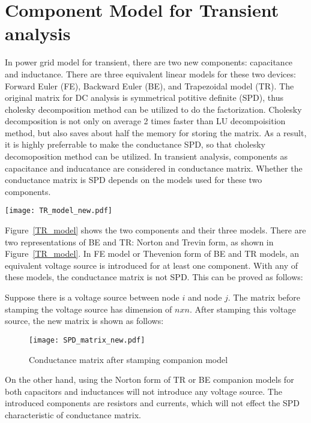 \section{Component Model for Transient analysis}
In power grid model for transient, there are two new components: capacitance and inductance. There are three equivalent linear models for
these two devices: Forward Euler (FE), Backward Euler (BE), and Trapezoidal model (TR). The original matrix for DC analysis is symmetrical potitive definite (SPD), thus cholesky decomposition method can be utilized to do the factorization. Cholesky decomposition is not only
on average 2 times faster than LU decompoisition method, but also saves about half the memory for storing the matrix. As a result, it is
highly preferrable to make the conductance SPD, so that cholesky decomoposition method can be utilized. In transient 
analysis, components as capacitance and inducatance are considered in conductance matrix. Whether the conductance matrix is SPD depends on
the models used for these two components. 
\begin{figure*}[htbp]
  \centering
  \texttt{[image: TR\_model\_new.pdf]}
  \caption{Companion models for capacitor and inductor.}
  \label{TR_model}
\end{figure*}

Figure~\ref{TR_model} shows the two components and their three models. There are two representations of BE and TR: Norton and Trevin form, as shown 
in Figure~\ref{TR_model}. In FE model or Thevenion form of BE and TR models, an equivalent voltage source is introduced for at least one component. 
With any of these models, the conductance matrix is not SPD. This can be proved as follows: 

Suppose there is a voltage source between node $i$ and node $j$. The matrix before stamping the voltage source has dimension of $nxn$. 
After stamping this voltage source, the new matrix is shown as follows:
\begin{figure}[htbp]
 \centering
 \texttt{[image: SPD\_matrix\_new.pdf]}
 \caption{Conductance matrix after stamping companion model}
 \label{SPD_matrix}
\end{figure} 

On the other hand, using the Norton form of TR or BE companion models for both capacitors and inductances will not introduce any 
voltage source. The introduced components are resistors and currents, which will not effect the SPD characteristic of conductance matrix. 
 
